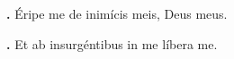 \textbf{\Vbar.} Éripe me de inimícis meis, Deus meus.

\textbf{\Rbar.} Et ab insurgéntibus in me líbera me.

